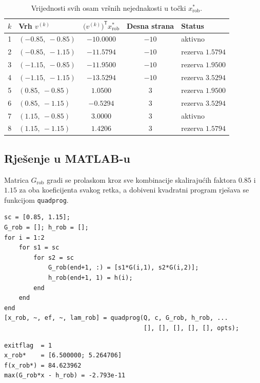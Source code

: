 \begin{table}[H]
\centering
\caption{Vrijednosti svih osam vršnih nejednakosti u točki $x_{\mathrm{rob}}^*$.}
\label{tab:rob_vrhovi}
\begin{tabular}{clccl}
\toprule
$k$ & \textbf{Vrh} $v^{(k)}$ & $\big(v^{(k)}\big)^{\mathsf{T}} x_{\mathrm{rob}}^*$ & \textbf{Desna strana} & \textbf{Status} \\
\midrule
1 & $(-0.85,\ -0.85)$ & $-10.0000$ & $-10$ & aktivno \\
2 & $(-0.85,\ -1.15)$ & $-11.5794$ & $-10$ & rezerva $1.5794$ \\
3 & $(-1.15,\ -0.85)$ & $-11.9500$ & $-10$ & rezerva $1.9500$ \\
4 & $(-1.15,\ -1.15)$ & $-13.5294$ & $-10$ & rezerva $3.5294$ \\
5 & $(0.85,\ -0.85)$  & $1.0500$   & $3$   & rezerva $1.9500$ \\
6 & $(0.85,\ -1.15)$  & $-0.5294$  & $3$   & rezerva $3.5294$ \\
7 & $(1.15,\ -0.85)$  & $3.0000$   & $3$   & aktivno \\
8 & $(1.15,\ -1.15)$  & $1.4206$   & $3$   & rezerva $1.5794$ \\
\bottomrule
\end{tabular}
\end{table}

\subsection{Rješenje u MATLAB-u}

Matrica $G_{\mathrm{rob}}$ gradi se prolaskom kroz sve kombinacije skalirajućih faktora $0.85$ i $1.15$ za oba koeficijenta svakog retka, a dobiveni kvadratni program rješava se funkcijom \texttt{quadprog}.

\begin{lstlisting}
sc = [0.85, 1.15];
G_rob = []; h_rob = [];
for i = 1:2
    for s1 = sc
        for s2 = sc
            G_rob(end+1, :) = [s1*G(i,1), s2*G(i,2)];
            h_rob(end+1, 1) = h(i);
        end
    end
end
[x_rob, ~, ef, ~, lam_rob] = quadprog(Q, c, G_rob, h_rob, ...
                                      [], [], [], [], [], opts);
\end{lstlisting}

\begin{lstlisting}[style=outputstyle]
exitflag  = 1
x_rob*    = [6.500000; 5.264706]
f(x_rob*) = 84.623962
max(G_rob*x - h_rob) = -2.793e-11
\end{lstlisting}

